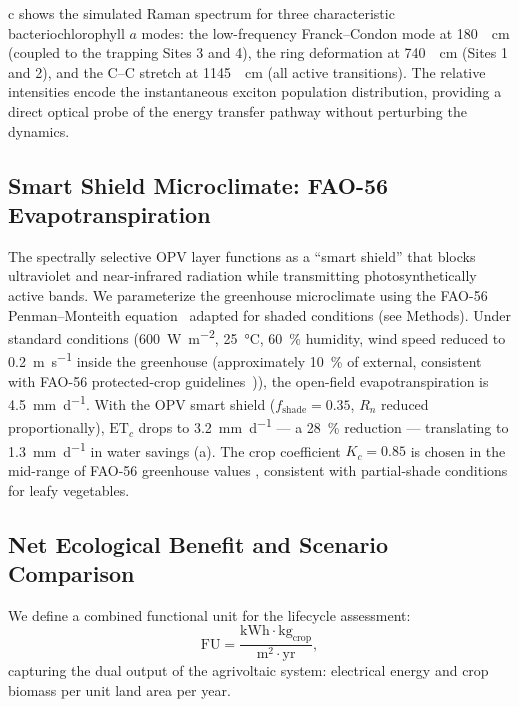 \documentclass[12pt]{article}
\begin{document}
c shows the simulated Raman spectrum for three characteristic bacteriochlorophyll $a$ modes:
the low-frequency Franck--Condon mode at \SI{180}{\per\cm} (coupled to the trapping Sites 3 and 4), the ring deformation at \SI{740}{\per\cm} (Sites 1 and 2), and the C--C stretch at \SI{1145}{\per\cm} (all active transitions).
The relative intensities encode the instantaneous exciton population distribution, providing a direct optical probe of the energy transfer pathway without perturbing the dynamics.

\subsection*{Smart Shield Microclimate: FAO-56 Evapotranspiration}

The spectrally selective OPV layer functions as a ``smart shield'' that blocks ultraviolet and near-infrared radiation while transmitting photosynthetically active bands.
We parameterize the greenhouse microclimate using the FAO-56 Penman--Monteith equation~\cite{Allen1998} adapted for shaded conditions (see Methods).
Under standard conditions (\SI{600}{\W\per\m\squared}, \SI{25}{\celsius}, \SI{60}{\percent} humidity, wind speed reduced to \SI{0.2}{\m\per\s} inside the greenhouse (approximately \SI{10}{\percent} of external, consistent with FAO-56 protected-crop guidelines~\cite{Allen1998})), the open-field evapotranspiration is \SI{4.5}{\mm\per\day}.
With the OPV smart shield ($f_{\mathrm{shade}} = 0.35$, $R_n$ reduced proportionally), $\mathrm{ET}_c$ drops to \SI{3.2}{\mm\per\day} --- a \SI{28}{\percent} reduction --- translating to \SI{1.3}{\mm\per\day} in water savings (a).
The crop coefficient $K_c = 0.85$ is chosen in the mid-range of FAO-56 greenhouse values \cite{Allen1998}, consistent with partial-shade conditions for leafy vegetables.

\subsection*{Net Ecological Benefit and Scenario Comparison}

We define a combined functional unit for the lifecycle assessment:
\begin{equation}
\mathrm{FU} = \frac{\mathrm{kWh} \cdot \mathrm{kg}_{\mathrm{crop}}}{\mathrm{m}^2 \cdot \mathrm{yr}},
\label{eq:functional_unit}
\end{equation}
capturing the dual output of the agrivoltaic system: electrical energy and crop biomass per unit land area per year.
\end{document}

